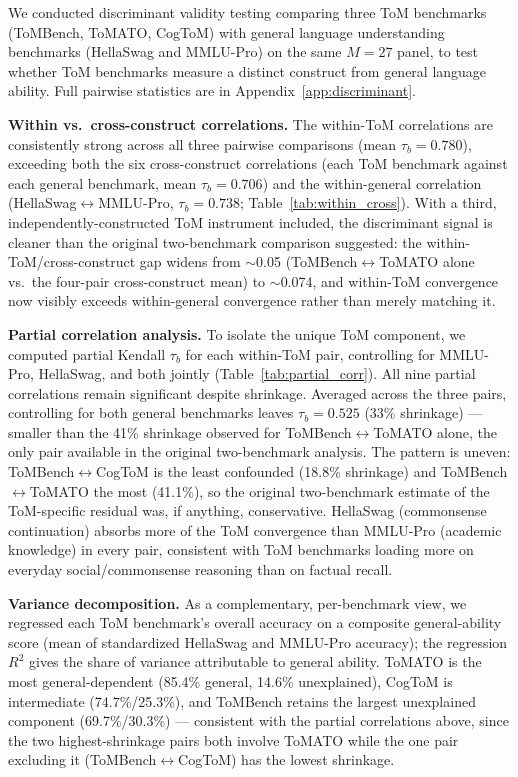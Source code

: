 \documentclass{article} %
\begin{document}
We conducted discriminant validity testing comparing three ToM benchmarks (ToMBench, ToMATO, CogToM) with general language understanding benchmarks (HellaSwag and MMLU-Pro) on the same $M=27$ panel, to test whether ToM benchmarks measure a distinct construct from general language ability. Full pairwise statistics are in Appendix~\ref{app:discriminant}.

\textbf{Within vs.\ cross-construct correlations.} The within-ToM correlations are consistently strong across all three pairwise comparisons (mean $\tau_b=0.780$), exceeding both the six cross-construct correlations (each ToM benchmark against each general benchmark, mean $\tau_b=0.706$) and the within-general correlation (HellaSwag$\leftrightarrow$MMLU-Pro, $\tau_b=0.738$; Table~\ref{tab:within_cross}). With a third, independently-constructed ToM instrument included, the discriminant signal is cleaner than the original two-benchmark comparison suggested: the within-ToM/cross-construct gap widens from $\sim$0.05 (ToMBench$\leftrightarrow$ToMATO alone vs.\ the four-pair cross-construct mean) to $\sim$0.074, and within-ToM convergence now visibly exceeds within-general convergence rather than merely matching it.

\textbf{Partial correlation analysis.} To isolate the unique ToM component, we computed partial Kendall $\tau_b$ for each within-ToM pair, controlling for MMLU-Pro, HellaSwag, and both jointly (Table~\ref{tab:partial_corr}). All nine partial correlations remain significant despite shrinkage. Averaged across the three pairs, controlling for both general benchmarks leaves $\tau_b=0.525$ (33\% shrinkage) --- smaller than the 41\% shrinkage observed for ToMBench$\leftrightarrow$ToMATO alone, the only pair available in the original two-benchmark analysis. The pattern is uneven: ToMBench$\leftrightarrow$CogToM is the least confounded (18.8\% shrinkage) and ToMBench$\leftrightarrow$ToMATO the most (41.1\%), so the original two-benchmark estimate of the ToM-specific residual was, if anything, conservative. HellaSwag (commonsense continuation) absorbs more of the ToM convergence than MMLU-Pro (academic knowledge) in every pair, consistent with ToM benchmarks loading more on everyday social/commonsense reasoning than on factual recall.

\textbf{Variance decomposition.} As a complementary, per-benchmark view, we regressed each ToM benchmark's overall accuracy on a composite general-ability score (mean of standardized HellaSwag and MMLU-Pro accuracy); the regression $R^2$ gives the share of variance attributable to general ability. ToMATO is the most general-dependent (85.4\% general, 14.6\% unexplained), CogToM is intermediate (74.7\%/25.3\%), and ToMBench retains the largest unexplained component (69.7\%/30.3\%) --- consistent with the partial correlations above, since the two highest-shrinkage pairs both involve ToMATO while the one pair excluding it (ToMBench$\leftrightarrow$CogToM) has the lowest shrinkage.
\end{document}
